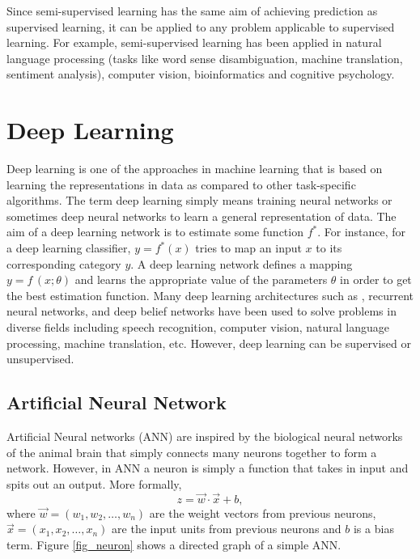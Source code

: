 \documentclass[master]{thesis-uestc}
\begin{document}
Since semi-supervised learning has the same aim of achieving prediction as supervised learning, it can be applied to any problem applicable to supervised learning. For example, semi-supervised learning has been applied in natural language processing (tasks like word sense disambiguation\cite{yarowsky13}, machine translation, sentiment analysis), computer vision, bioinformatics and cognitive psychology.

\section{Deep Learning}
Deep learning is one of the approaches in machine learning that is based on learning the representations in data as compared to other task-specific algorithms. The term deep learning simply means training neural networks or sometimes deep neural networks to learn a general representation of data. The aim of a deep learning network is to estimate some function $f^*$. For instance, for a deep learning classifier, $y = f^*(x)$ tries to map an input $x$ to its corresponding category $y$. A deep learning network defines a mapping $y = f\,(x;\theta)$ and learns the appropriate value of the parameters $\theta$ in order to get the best estimation function. Many deep learning architectures such as \cite{Ivanovsky-2017}\cite{Kri12}\cite{Chr14}, recurrent neural networks\cite{7914752}\cite{7801769}, and deep belief networks\cite{7111524}\cite{7539822} have been used to solve problems in diverse fields including speech recognition, computer vision, natural language processing, machine translation, etc. However, deep learning can be supervised or unsupervised.

\subsection{Artificial Neural Network}
Artificial Neural networks (ANN) are inspired by the biological neural networks of the animal brain that simply connects many neurons together to form a network. However, in ANN a neuron is simply a function that takes in input and spits out an output. More formally,
\begin{equation}
    z = \vec{w} \cdot \vec{x} + b,
\end{equation}
where $\vec{w} = (w_1, w_2, \dots, w_n)$ are the weight vectors from previous neurons, $\vec{x} = (x_1, x_2, \dots, x_n)$ are the input units from previous neurons and $b$ is a bias term. Figure \ref{fig_neuron} shows a directed graph of a simple ANN.
\end{document}
